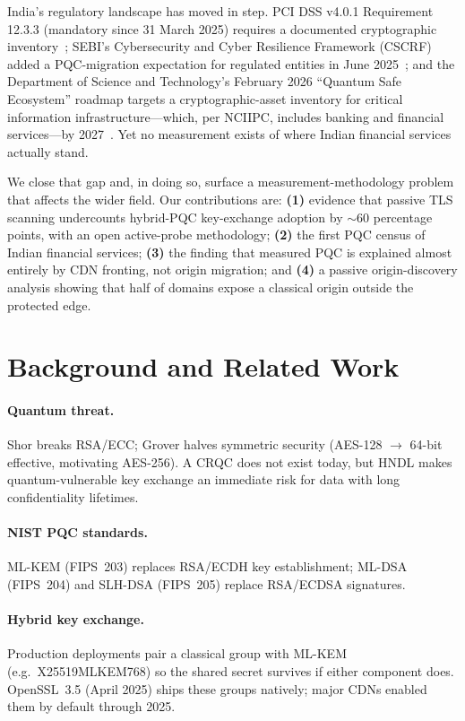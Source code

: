 \documentclass[11pt]{article}
\begin{document}
India's regulatory landscape has moved in step. PCI DSS v4.0.1 Requirement 12.3.3 (mandatory
since 31 March 2025) requires a documented cryptographic inventory~\cite{pci}; SEBI's
Cybersecurity and Cyber Resilience Framework (CSCRF) added a PQC-migration expectation for
regulated entities in June 2025~\cite{sebi}; and the Department of Science and Technology's
February 2026 ``Quantum Safe Ecosystem'' roadmap targets a cryptographic-asset inventory for
critical information infrastructure---which, per NCIIPC, includes banking and financial
services---by 2027~\cite{dst}. Yet no measurement exists of where Indian financial services
actually stand.

We close that gap and, in doing so, surface a measurement-methodology problem that affects the
wider field. Our contributions are: \textbf{(1)} evidence that passive TLS scanning undercounts
hybrid-PQC key-exchange adoption by ${\sim}60$ percentage points, with an open active-probe
methodology; \textbf{(2)} the first PQC census of Indian financial services; \textbf{(3)} the
finding that measured PQC is explained almost entirely by CDN fronting, not origin migration;
and \textbf{(4)} a passive origin-discovery analysis showing that half of domains expose a
classical origin outside the protected edge.

\section{Background and Related Work}

\paragraph{Quantum threat.} Shor breaks RSA/ECC; Grover halves symmetric security (AES-128
$\rightarrow$ 64-bit effective, motivating AES-256). A CRQC does not exist today, but HNDL makes
quantum-vulnerable key exchange an immediate risk for data with long confidentiality lifetimes.

\paragraph{NIST PQC standards.} ML-KEM (FIPS~203) replaces RSA/ECDH key establishment; ML-DSA
(FIPS~204) and SLH-DSA (FIPS~205) replace RSA/ECDSA signatures.

\paragraph{Hybrid key exchange.} Production deployments pair a classical group with ML-KEM
(e.g.\ X25519MLKEM768) so the shared secret survives if either component does. OpenSSL~3.5
(April 2025) ships these groups natively; major CDNs enabled them by default through 2025.
\end{document}

